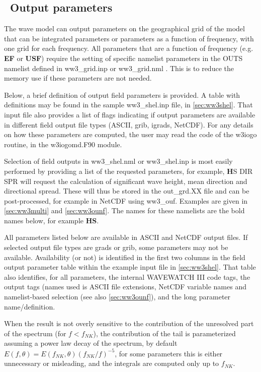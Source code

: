 \vssub
\subsection{~Output parameters} \label{sub:outpars}
\vssub

The wave model can output parameters on the geographical grid of the model that can be integrated parameters or 
parameters as a function of frequency, with one grid for each frequency. All parameters that are a function of frequency (e.g.  \textbf{EF} or \textbf{USF}) require the setting 
of specific namelist parameters in the {\F OUTS} namelist defined in ww3\_grid.inp or  ww3\_grid.nml . This is to reduce the memory use
if these parameters are not needed. 

Below, a brief definition of output field parameters is provided. A table
with definitions may be found in the sample {\code ww3\_shel.inp} file,
in \para\ref{sec:ww3shel}. That input file also provides a list of flags  
indicating if output parameters are available in different field
output file types (ASCII, grib, igrads, NetCDF). 
For any details on how these parameters are computed, the user may read the code of the  {\code w3iogo} routine, in the {\code w3iogomd.F90} module.

Selection of field outputs in {\code ww3\_shel.nml} or {\code ww3\_shel.inp} is most easily performed by providing a list of the 
requested parameters, for example, {\textbf HS DIR SPR}  will request the calculation of significant wave height, mean direction and directional spread. These will thus be stored in the {\code out\_grd.XX} file and can be post-processed, for example in NetCDF using   {\code ww3\_ouf}. Examples are given in \para\ref{sec:ww3multi} and
\para\ref{sec:ww3ounf}. The names for these namelists are the bold names below, for 
example \textbf{HS}. 

All parameters listed below are available in ASCII and NetCDF output files. If selected output file types are grads or grib, some parameters may not be available. Availability (or not) is identified
in the first two columns in the field output parameter table within the example input file in  
\para\ref{sec:ww3shel}. That table also identifies, for all parameters,
the internal WAVEWATCH III code tags, the output tags (names used is ASCII 
file extensions, NetCDF variable names and namelist-based selection (see 
also \para\ref{sec:ww3ounf}), and the long parameter name/definition.

When the result is not overly sensitive to the contribution of the unresolved part of the spectrum (for $f<f_{NK}$), the contribution of the tail is parameterized assuming a power law decay of the spectrum, by default $E(f,\theta) = E(f_{NK},\theta) (f_{NK}/f)^{-5}$, for some parameters this is either unnecessary or misleading, and the integrals are computed only up to $f_{NK}$. 

